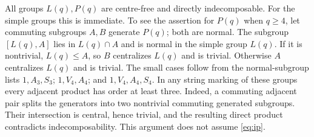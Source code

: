 All groups $L(q),P(q)$ are centre-free and directly indecomposable. For the
simple groups this is immediate. To see the assertion for $P(q)$ when
$q\ge4$, let commuting subgroups $A,B$ generate $P(q)$; both are normal.
The subgroup $[L(q),A]$ lies in $L(q)\cap A$ and is normal in the simple
group $L(q)$. If it is nontrivial, $L(q)\le A$, so $B$ centralizes $L(q)$
and is trivial. Otherwise $A$ centralizes $L(q)$ and is trivial. The small
cases follow from the normal-subgroup lists
$1,A_3,S_3$; $1,V_4,A_4$; and $1,V_4,A_4,S_4$.
In any string marking of these groups every adjacent product has order
at least three. Indeed, a commuting adjacent pair splits the generators
into two nontrivial commuting generated subgroups. Their intersection is
central, hence trivial, and the resulting direct product contradicts
indecomposability. This argument does not assume \eqref{eq:ip}.

